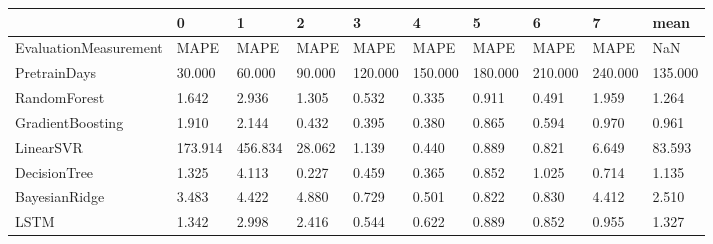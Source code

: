 \begin{tabular}{llllllllll}
\toprule
{} &       0 &       1 &      2 &       3 &       4 &       5 &       6 &       7 &    mean \\
\midrule
EvaluationMeasurement &    MAPE &    MAPE &   MAPE &    MAPE &    MAPE &    MAPE &    MAPE &    MAPE &     NaN \\
PretrainDays          &  30.000 &  60.000 & 90.000 & 120.000 & 150.000 & 180.000 & 210.000 & 240.000 & 135.000 \\
RandomForest          &   1.642 &   2.936 &  1.305 &   0.532 &   0.335 &   0.911 &   0.491 &   1.959 &   1.264 \\
GradientBoosting      &   1.910 &   2.144 &  0.432 &   0.395 &   0.380 &   0.865 &   0.594 &   0.970 &   0.961 \\
LinearSVR             & 173.914 & 456.834 & 28.062 &   1.139 &   0.440 &   0.889 &   0.821 &   6.649 &  83.593 \\
DecisionTree          &   1.325 &   4.113 &  0.227 &   0.459 &   0.365 &   0.852 &   1.025 &   0.714 &   1.135 \\
BayesianRidge         &   3.483 &   4.422 &  4.880 &   0.729 &   0.501 &   0.822 &   0.830 &   4.412 &   2.510 \\
LSTM                  &   1.342 &   2.998 &  2.416 &   0.544 &   0.622 &   0.889 &   0.852 &   0.955 &   1.327 \\
\bottomrule
\end{tabular}
